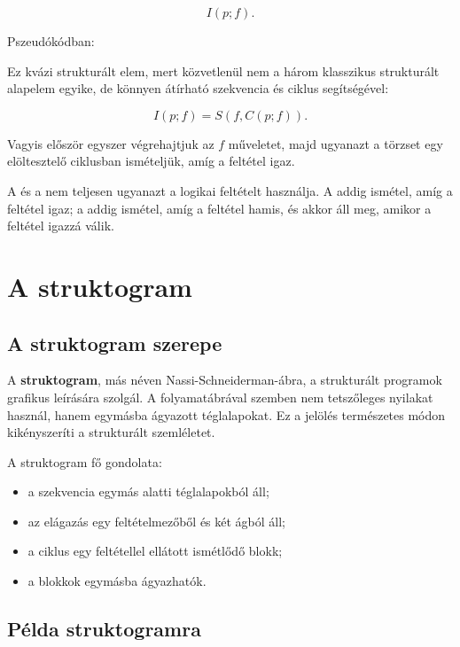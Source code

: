 \[
I(p;f).
\]

Pszeudókódban:


Ez kvázi strukturált elem, mert közvetlenül nem a három klasszikus strukturált alapelem egyike, de könnyen átírható szekvencia és ciklus segítségével:

\[
I(p;f)=S(f,C(p;f)).
\]

Vagyis először egyszer végrehajtjuk az $f$ műveletet, majd ugyanazt a törzset egy elöltesztelő ciklusban ismételjük, amíg a feltétel igaz.

\begin{warningbox}
A  és a  nem teljesen ugyanazt a logikai feltételt használja. A  addig ismétel, amíg a feltétel igaz; a  addig ismétel, amíg a feltétel hamis, és akkor áll meg, amikor a feltétel igazzá válik.
\end{warningbox}

\section{A struktogram}

\subsection{A struktogram szerepe}

A \textbf{struktogram}, más néven Nassi-Schneiderman-ábra, a strukturált programok grafikus leírására szolgál. A folyamatábrával szemben nem tetszőleges nyilakat használ, hanem egymásba ágyazott téglalapokat. Ez a jelölés természetes módon kikényszeríti a strukturált szemléletet.

A struktogram fő gondolata:

\begin{itemize}
  \item a szekvencia egymás alatti téglalapokból áll;
  \item az elágazás egy feltételmezőből és két ágból áll;
  \item a ciklus egy feltétellel ellátott ismétlődő blokk;
  \item a blokkok egymásba ágyazhatók.
\end{itemize}

\subsection{Példa struktogramra}

